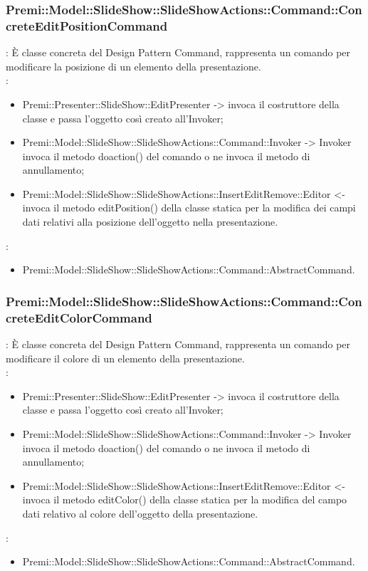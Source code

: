{                    \subsubsection{Premi::Model::SlideShow::SlideShowActions::Command::ConcreteEditPositionCommand}{
				\textbf{\tipo}: È classe concreta del Design Pattern Command, rappresenta un comando per modificare la posizione di un elemento della presentazione.\\	
				\textbf{\relaz}: 
				\begin{itemize}
					\item Premi::Presenter::SlideShow::EditPresenter -> invoca il costruttore della classe e passa l’oggetto così creato all’Invoker;
					\item Premi::Model::SlideShow::SlideShowActions::Command::Invoker -> Invoker invoca il metodo doaction() del comando o ne invoca il metodo di annullamento;
                    \item Premi::Model::SlideShow::SlideShowActions::InsertEditRemove::Editor <- invoca il metodo editPosition() della classe statica per la modifica dei campi dati relativi alla posizione dell'oggetto nella presentazione.
				\end{itemize}	
                \textbf{\base}: 
                    \begin{itemize}
                    \item Premi::Model::SlideShow::SlideShowActions::Command::AbstractCommand.
                    \end{itemize}
                    }
                    \subsubsection{Premi::Model::SlideShow::SlideShowActions::Command::ConcreteEditColorCommand}{
				\textbf{\tipo}: È classe concreta del Design Pattern Command, rappresenta un comando per modificare il colore di un elemento della presentazione.\\	
				\textbf{\relaz}: 
				\begin{itemize}
					\item Premi::Presenter::SlideShow::EditPresenter -> invoca il costruttore della classe e passa l’oggetto così creato all’Invoker;
					\item Premi::Model::SlideShow::SlideShowActions::Command::Invoker -> Invoker invoca il metodo doaction() del comando o ne invoca il metodo di annullamento;
                    \item Premi::Model::SlideShow::SlideShowActions::InsertEditRemove::Editor <- invoca il metodo editColor() della classe statica per la modifica del campo dati relativo al colore dell'oggetto della presentazione.
				\end{itemize}	
                \textbf{\base}: 
                    \begin{itemize}
                    \item Premi::Model::SlideShow::SlideShowActions::Command::AbstractCommand.
                    \end{itemize}
                    }
}
